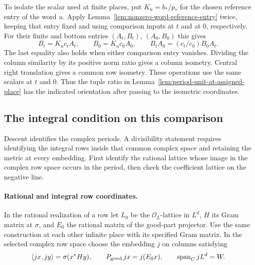 To isolate the scalar used at finite places, put \(K_u=b_*/p_*\)
for the chosen reference entry of the word \(u\). Apply
Lemma~\ref{lem:nonzero-word-reference-entry} twice, keeping that entry
fixed and using comparison inputs at \(t\) and at \(0\), respectively.
For their finite and bottom entries \((A_t,B_t)\), \((A_0,B_0)\) this gives
\begin{equation}\label{eq:word-period-cross-product}
 B_t=K_u c_t A_t,\qquad B_0=K_u c_0 A_0,\qquad
 B_t A_0=(c_t/c_0)B_0 A_t .
\end{equation}
The last equality also holds when either comparison entry vanishes.
Dividing the column similarity by its positive norm ratio gives a column
isometry. Central right translation gives a common row isometry. These
operations use the same scalars at \(t\) and \(0\). Thus the tuple
ratio in Lemma~\ref{lem:period-unit-at-assigned-place} has the indicated
orientation after passing to the isometric coordinates.

\subsection{The integral condition on this comparison}

Descent identifies the complex periods. A divisibility statement requires identifying the integral rows inside that common complex space and retaining the metric at every embedding. First identify the
rational lattice whose image in the complex row space occurs in the period, then
check the coefficient lattice on the negative line.

\paragraph{Rational and integral row coordinates.}
In the rational realization of a row let \(L_0\)
be the \(\mathcal O_L\)-lattice in \(L^d\), \(H\) its Gram
matrix at \(\sigma\), and \(E_0\) the rational matrix of the
good-part projector. Use the same construction at each other
infinite place with its specified Gram matrix. In the selected
complex row space choose the embedding \(j\) on columns
satisfying
\[
 \langle jx,jy\rangle=\sigma(x^*Hy),\qquad
 P_{\rm good}\,jx=j(E_0x),\qquad
           \operatorname{span}_{C} jL^d=W .
\]



